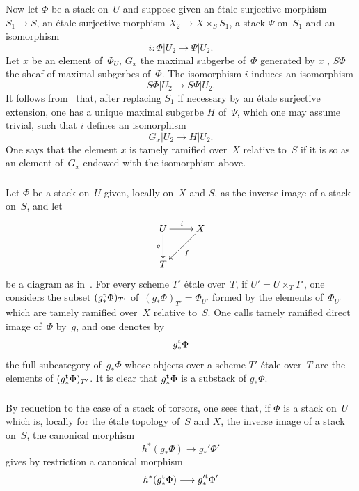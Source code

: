 Now let $\Phi$ be a stack on~$U$ and suppose given an
étale surjective morphism $S_1\to S$, an étale surjective
morphism $X_2\to X\times_S S_1$, a stack $\Psi$ on~$S_1$ and an
isomorphism
$$
i\colon \Phi|U_2\to \Psi|U_2.
$$
Let $x$ be an element of~$\Phi_U$, $G_x$ the maximal subgerbe
of~$\Phi$ generated by $x$
\cite[III~2.1.7]{XIII.1}, $S\Phi$ the sheaf of
maximal subgerbes of~$\Phi$. The isomorphism $i$ induces an
isomorphism
$$
S\Phi|U_2\to S\Psi|U_2.
$$
It follows from~ that, after replacing $S_1$ if necessary by
an étale surjective extension, one has a unique maximal
subgerbe $H$ of~$\Psi$, which one may assume trivial, such that $i$
defines an isomorphism
$$
G_x|U_2\to H|U_2.
$$
One says that the element $x$ is tamely ramified
over~$X$ relative to~$S$ if it is so as an element
of~$G_x$ endowed with the isomorphism above.

\subsubsection{}
\label{XIII.2.2.1}
Let $\Phi$ be a stack on~$U$ given, locally on~$X$ and $S$,
as the inverse image of a stack on~$S$, and let
$$
\xymatrix{ U \ar[r]^i
\ar[d]_g & X \ar[dl]^f \\ T }
$$
be a diagram as in~. For every scheme $T'$
étale over~$T$, if $U'=U\times_T T'$, one considers the
subset $(g_*^{\mathrm{t}}\Phi)_{T'}$
of~$(g_*\Phi)_{T'}=\Phi_{U'}$
formed
by the elements of~$\Phi_{U'}$ which are tamely
ramified
over~$X$ relative to~$S$. One calls tamely ramified
direct image
of~$\Phi$ by~$g$, and one denotes by
$$
g_*^{\mathrm{t}}\Phi
$$
the full subcategory of~$g_*\Phi$ whose objects over
a scheme $T'$ étale over~$T$ are the elements of
$(g_*^{\mathrm{t}}\Phi)_{T'}$. It is clear that $g_*^{\mathrm{t}}\Phi$ is a substack of
$g_*\Phi$.

\subsubsection{}
\label{XIII.2.2.2}
By reduction to the case of a stack of torsors, one sees that, if
$\Phi$ is a stack on~$U$ which is, locally for the
étale topology of~$S$ and $X$, the inverse image of a stack on~$S$, the canonical
morphism
$$
h^*(g_*\Phi)\to g_*'\Phi'
$$
gives by restriction a canonical morphism
$$
h^*(g_*^{\tame}\Phi)\to g_*^{\prime\tame}\Phi'
$$

